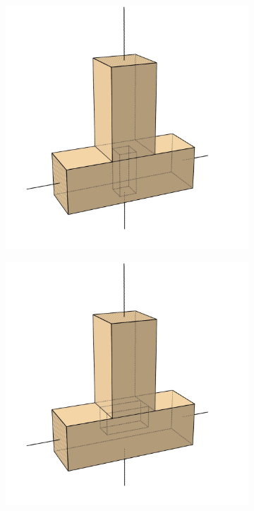 \documentclass[11pt]{book}
\begin{document}
\begin{figure}[H]
\begin{subfigure}[b]{0.18\textwidth}
\end{subfigure}
\hfill
\begin{subfigure}[b]{0.18\textwidth}
\centering
\includegraphics[width=\textwidth]{./images/image13.jpg}
\end{subfigure}
\hfill
\begin{subfigure}[b]{0.18\textwidth}
\centering
\includegraphics[width=\textwidth]{./images/image18.jpg}

\end{subfigure}
\end{figure}
\end{document}
